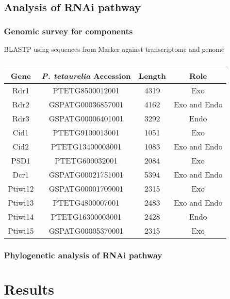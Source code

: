 \subsection{Analysis of RNAi pathway}

\subsubsection{Genomic survey for components}

BLASTP using sequences from Marker against transcriptome
and genome

\begin{table}
    \centering
    \begin{tabular}{|c|c|c|c|}
        \hline
        \textbf{Gene} & \textbf{\textit{P. tetaurelia} Accession} & \textbf{Length} & \textbf{Role} \\
        \hline
        Rdr1 & PTETG8500012001 & 4319 & Exo\\
        Rdr2 & GSPATG00036857001 & 4162 & Exo and Endo\\
        Rdr3 & GSPATG00006401001 & 3292 & Endo \\
        Cid1 & PTETG9100013001 & 1051 & Exo\\
        Cid2 & PTETG13400003001 & 1083 & Exo and Endo \\
        PSD1 & PTETG600032001 & 2084 & Exo \\
        Dcr1 & GSPATG00021751001 & 5394 & Exo and Endo\\
        Ptiwi12 & GSPATG00001709001 & 2315 & Exo \\
        Ptiwi13 & PTETG4800007001 & 2483 & Exo and Endo \\
        Ptiwi14 & PTETG16300003001 & 2428 & Endo \\
        Ptiwi15 & GSPATG00005370001 & 2315 & Exo \\
        \hline
    \end{tabular}
    \caption[RNAi pathway components from Marker]{\citep{Marker2014}}
\end{table}



\subsubsection{Phylogenetic analysis of RNAi pathway}




\section{Results}


